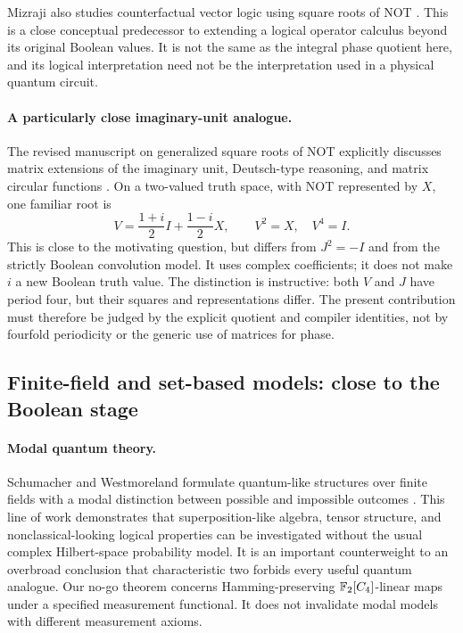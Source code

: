 Mizraji also studies counterfactual vector logic using square roots of NOT \cite{mizraji2021}. This is a close conceptual predecessor to extending a logical operator calculus beyond its original Boolean values. It is not the same as the integral phase quotient here, and its logical interpretation need not be the interpretation used in a physical quantum circuit.

\paragraph{A particularly close imaginary-unit analogue.}
The revised manuscript on generalized square roots of NOT explicitly discusses matrix extensions of the imaginary unit, Deutsch-type reasoning, and matrix circular functions \cite{mizraji2024}. On a two-valued truth space, with NOT represented by $X$, one familiar root is
\begin{equation}
 V=\frac{1+i}{2}I+\frac{1-i}{2}X,\qquad V^2=X,\quad V^4=I.
\end{equation}
This is close to the motivating question, but differs from $J^2=-I$ and from the strictly Boolean convolution model. It uses complex coefficients; it does not make $i$ a new Boolean truth value. The distinction is instructive: both $V$ and $J$ have period four, but their squares and representations differ. The present contribution must therefore be judged by the explicit quotient and compiler identities, not by fourfold periodicity or the generic use of matrices for phase.

\subsection{Finite-field and set-based models: close to the Boolean stage}
\paragraph{Modal quantum theory.}
Schumacher and Westmoreland formulate quantum-like structures over finite fields with a modal distinction between possible and impossible outcomes \cite{modal}. This line of work demonstrates that superposition-like algebra, tensor structure, and nonclassical-looking logical properties can be investigated without the usual complex Hilbert-space probability model. It is an important counterweight to an overbroad conclusion that characteristic two forbids every useful quantum analogue. Our no-go theorem concerns Hamming-preserving $\mathbb F_2[C_4]$-linear maps under a specified measurement functional. It does not invalidate modal models with different measurement axioms.

